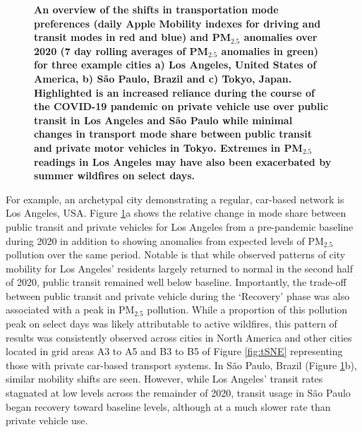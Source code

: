 \documentclass[preprint,10pt]{elsarticle} %
\begin{document}
\begin{figure}
         \label{fig:Tokyo}
        \caption{\bf An overview of the shifts in transportation mode preferences (daily Apple Mobility indexes for driving and transit modes in red and blue) and PM$_{2.5}$ anomalies over 2020 (7 day rolling averages of PM$_{2.5}$ anomalies in green) for three example cities a) Los Angeles, United States of America, b) S\~ao Paulo, Brazil and c) Tokyo, Japan. Highlighted is an increased reliance during the course of the COVID-19 pandemic on private vehicle use over public transit in Los Angeles and S\~ao Paulo while minimal changes in transport mode share between public transit and private motor vehicles in Tokyo. Extremes in PM$_{2.5}$ readings in Los Angeles may have also been exacerbated by summer wildfires on select days.}
        \label{fig:three_graphs_Driv_trans}
\end{figure}

For example, an archetypal city demonstrating a regular, car-based network is Los Angeles, USA. Figure \ref{fig:three_graphs_Driv_trans}a shows the relative change in mode share between public transit and private vehicles for Los Angeles from a pre-pandemic baseline during 2020 in addition to showing anomalies from expected levels of PM$_{2.5}$ pollution over the same period. Notable is that while observed patterns of city mobility for Los Angeles' residents largely returned to normal in the second half of 2020, public transit remained well below baseline. Importantly, the trade-off between public transit and private vehicle during the `Recovery' phase was also associated with a peak in PM$_{2.5}$ pollution. While a proportion of this pollution peak on select days was likely attributable to active wildfires, this pattern of results was consistently observed across cities in North America and other cities located in grid areas A3 to A5 and B3 to B5 of Figure \ref{fig:tSNE} representing those with private car-based transport systems. In S\~ao Paulo, Brazil (Figure \ref{fig:three_graphs_Driv_trans}b), similar mobility shifts are seen. However, while Los Angeles' transit rates stagnated at low levels across the remainder of 2020, transit usage in S\~ao Paulo began recovery toward baseline levels, although at a much slower rate than private vehicle use.
\end{document}
